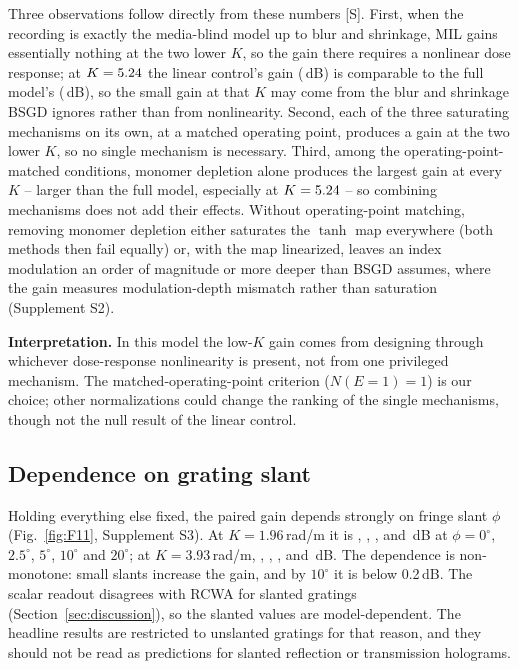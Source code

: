 \documentclass{optica-article}
\begin{document}
Three observations follow directly from these numbers [S]. First, when the
recording is exactly the media-blind model up to blur and shrinkage, MIL
gains essentially nothing at the two lower $K$, so the gain there requires a
nonlinear dose response; at $K=5.24$ the linear control's gain
(\SXGLinearMatchedPost\,dB) is comparable to the full model's
(\SOneGBaselinePost\,dB), so the small gain at that $K$ may come from the blur
and shrinkage BSGD ignores rather than from nonlinearity. Second, each of the three saturating mechanisms on
its own, at a matched operating point, produces a gain at the two lower $K$,
so no single mechanism is necessary. Third, among the operating-point-matched
conditions, monomer depletion alone produces the largest gain at every $K$ --
larger than the full model, especially at
$K=5.24$ -- so combining mechanisms does not add their effects.
Without operating-point matching, removing monomer depletion either saturates
the $\tanh$ map everywhere (both methods then fail equally) or, with the map
linearized, leaves an index modulation an order of magnitude or more
deeper than BSGD assumes, where the gain measures modulation-depth mismatch rather than
saturation (Supplement S2).

\textbf{Interpretation.} In this model the low-$K$ gain comes from designing
through whichever dose-response nonlinearity is present, not from one
privileged mechanism. The matched-operating-point criterion ($N(E{=}1)=1$) is our
choice; other normalizations could change the ranking of the single
mechanisms, though not the null result of the linear control.

\subsection{Dependence on grating slant}
\label{sec:slant}
Holding everything else fixed, the paired gain depends strongly on fringe
slant $\phi$ (Fig.~\ref{fig:F11}, Supplement S3). At $K=1.96$\,rad/\textmu m
it is \SEightGainKLowSlantZero, \SEightGainKLowSlantTwoFive,
\SEightGainKLowSlantFive, \SEightGainKLowSlantTen{} and
\SEightGainKLowSlantTwenty\,dB at $\phi=0^\circ$, $2.5^\circ$, $5^\circ$,
$10^\circ$ and $20^\circ$; at $K=3.93$\,rad/\textmu m,
\SEightGainKMidSlantZero, \SEightGainKMidSlantTwoFive,
\SEightGainKMidSlantFive, \SEightGainKMidSlantTen{} and
\SEightGainKMidSlantTwenty\,dB. The dependence is non-monotone: small slants
increase the gain, and by $10^\circ$ it is below 0.2\,dB. The scalar readout
disagrees with RCWA for slanted gratings (Section~\ref{sec:discussion}), so
the slanted values are model-dependent. The headline results are restricted
to unslanted gratings for that reason, and they should not be read as
predictions for slanted reflection or transmission holograms.
\end{document}
